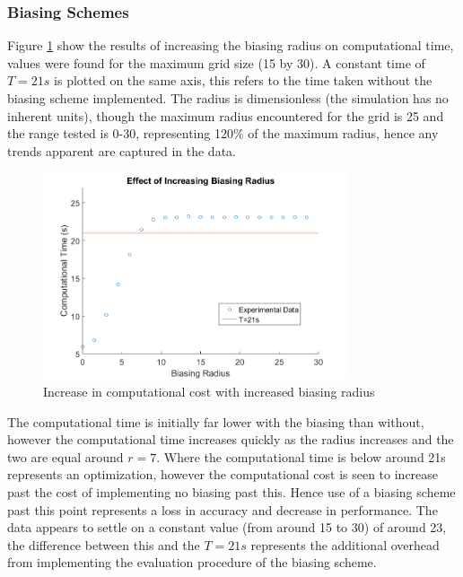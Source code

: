 \subsubsection{Biasing Schemes}
Figure \ref{fig:RadiusBiasTimes} show the results of increasing the biasing radius on computational time, values were found for the maximum grid size (15 by 30). A constant time of $T=21s$ is plotted on the same axis, this refers to the time taken without the biasing scheme implemented. The radius is dimensionless (the simulation has no inherent units), though the maximum radius encountered for the grid is 25 and the range tested is 0-30, representing 120\% of the maximum radius, hence any trends apparent are captured in the data.
\begin{figure}[H]
\centering
\includegraphics[width=0.8\textwidth]{Figures/RadiusBiasTimes.png}
\caption{\label{fig:RadiusBiasTimes} Increase in computational cost with increased biasing radius}
\end{figure} 

The computational time is initially far lower with the biasing than without, however the computational time increases quickly as the radius increases and the two are equal around $r=7$. Where the computational time is below around 21s represents an optimization, however the computational cost is seen to increase past the cost of implementing no biasing past this. Hence use of a biasing scheme past this point represents a loss in accuracy and decrease in performance. The data appears to settle on a constant value (from around 15 to 30) of around 23, the difference between this and the $T=21s$ represents the additional overhead from implementing the evaluation procedure of the biasing scheme.

